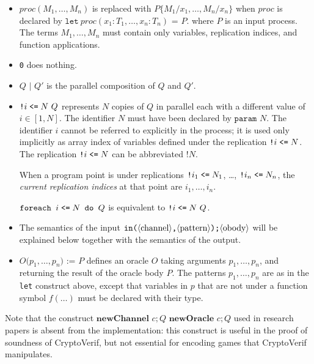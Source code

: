 \begin{itemize}

\item $\mathit{proc}(M_1, \dots, M_n)$ is replaced with $P\{M_1/x_1, \dots, M_n/x_n\}$ when $\mathit{proc}$ is declared by $\texttt{let}\ \mathit{proc}(x_1:T_1, \dots, x_n:T_n)\texttt{ = }P\texttt{.}$
where $P$ is an input process.
The terms $M_1, \dots, M_n$ must contain only variables, replication indices, and function applications.

\item \texttt{0} does nothing.

\item $Q \texttt{ | } Q'$ is the parallel composition of $Q$ and $Q'$.

\item $\texttt{!}i\mathrel{\texttt{<=}} N\ Q$ represents $N$ copies of $Q$ in
parallel each with a different value of $i \in [1,N]$.  The identifier
$N$ must have been declared by $\texttt{param }N$.  The identifier $i$
cannot be referred to explicitly in the process; it is used only
implicitly as array index of variables defined under the replication
$\texttt{!}i\mathrel{\texttt{<=}} N$. The replication $\texttt{!}i\mathrel{\texttt{<=}} N$ can be 
abbreviated $\texttt{!} N$.

When a program point is under replications $\texttt{!}i_1\mathrel{\texttt{<=}} N_1$,
\ldots, $\texttt{!}i_n\mathrel{\texttt{<=}} N_n$, the \emph{current replication
indices} at that point are $i_1, \ldots, i_n$.

$\texttt{foreach }i\mathrel{\texttt{<=}} N\texttt{ do }Q$ is equivalent to
$\texttt{!}i\mathrel{\texttt{<=}} N\ Q$.

\ifchannels
\item The semantics of the input 
$\texttt{in(}\langle\textrm{channel}\rangle\texttt{,}\langle\textrm{pattern}\rangle\texttt{);}\langle\textrm{obody}\rangle$
will be explained below together with the
semantics of the output. 

\else
\item $O\texttt{(}p_1, \ldots, p_n\texttt{) := }P$ defines an oracle
$O$ taking arguments $p_1, \ldots, p_n$, and returning the result of
the oracle body $P$. The patterns $p_1, \ldots, p_n$ are as in the
\texttt{let} construct above, except that variables in $p$ that are
not under a function symbol $f(\ldots)$ must be declared with their
type.

\fi

\end{itemize}
Note that the construct \ifchannels $\textbf{newChannel }c;Q$ \else
$\textbf{newOracle }c;Q$ \fi used in research papers
is absent from the implementation: this construct is useful in the proof
of soundness of CryptoVerif, but not essential for encoding games
that CryptoVerif manipulates.

